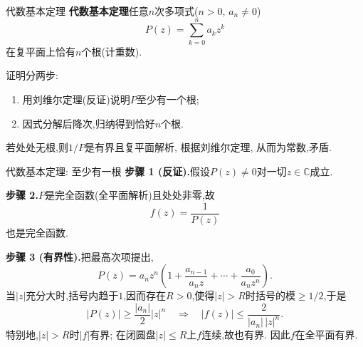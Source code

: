 \documentclass[fontset=windows, chinese, 10pt]{beamer}
\begin{document}
\begin{frame}{代数基本定理}
\small
\textbf{代数基本定理}\quad 任意$n$次多项式($n>0$, $a_n\neq 0$)
\begin{equation}
    P(z) = \sum_{k=0}^{n} a_k z^k
    \label{eq:poly}
\end{equation}
在复平面上恰有$n$个根(计重数).

证明分两步:
\begin{enumerate}
    \item 用刘维尔定理(反证)说明$P$至少有一个根;
    \item 因式分解后降次,归纳得到恰好$n$个根.
\end{enumerate}
若处处无根,则$1/P$是有界且复平面解析, 根据刘维尔定理, 从而为常数,矛盾.
\end{frame}

\begin{frame}{代数基本定理: 至少有一根}
\small
\textbf{步骤 1 (反证).}\quad 假设$P(z)\neq 0$对一切$z\in\mathbb{C}$成立.

\textbf{步骤 2.}\quad $P$是完全函数(全平面解析)且处处非零,故
\[
    f(z)=\frac{1}{P(z)}
\]
也是完全函数.

\textbf{步骤 3 (有界性).}\quad 把最高次项提出,
\[
    P(z)=a_n z^n\left(1+\frac{a_{n-1}}{a_n z}+\cdots+\frac{a_0}{a_n z^n}\right).
\]
当$|z|$充分大时,括号内趋于$1$,因而存在$R>0$,使得$|z|>R$时括号的模$\geq 1/2$,于是
\[
    |P(z)|\geq \frac{|a_n|}{2}|z|^n
    \quad\Longrightarrow\quad
    |f(z)|\leq \frac{2}{|a_n|\,|z|^n}.
\]
特别地,$|z|>R$时$|f|$有界; 在闭圆盘$|z|\leq R$上$f$连续,故也有界. 因此$f$在全平面有界.
\end{frame}
\end{document}
